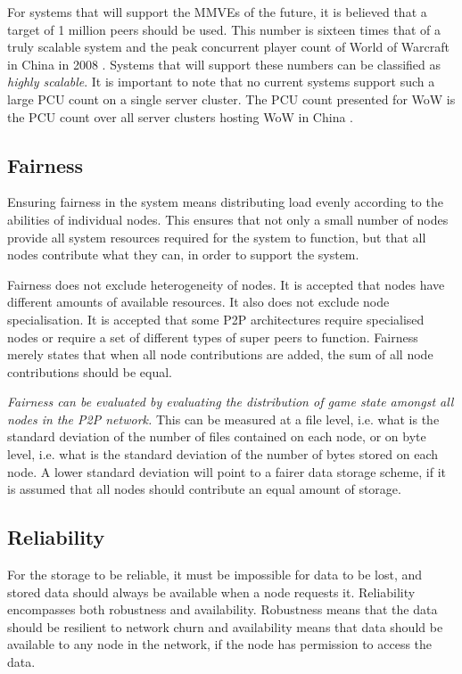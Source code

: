 For systems that will support the MMVEs of the future, it is believed that a target of 1 million peers should be used. This number is sixteen times that of a truly scalable system and the peak concurrent player count of World of Warcraft in China in 2008 \cite{WoW_china_pcu}. Systems that will support these numbers can be classified as \emph{highly scalable}. It is important to note that no current systems support such a large PCU count on a single server cluster. The PCU count presented for WoW is the PCU count over all server clusters hosting WoW in China \cite{WoW_china_pcu}.

\subsection{Fairness}
\label{fairness_requirement}

Ensuring fairness in the system means distributing load evenly according to the abilities of individual nodes. This ensures that not only a small number of nodes provide all system resources required for the system to function, but that all nodes contribute what they can, in order to support the system.

Fairness does not exclude heterogeneity of nodes. It is accepted that nodes have different amounts of available resources. It also does not exclude node specialisation. It is accepted that some P2P architectures require specialised nodes or require a set of different types of super peers to function. Fairness merely states that when all node contributions are added, the sum of all node contributions should be equal.

\emph{Fairness can be evaluated by evaluating the distribution of game state amongst all nodes in the P2P network.} This can be measured at a file level, i.e. what is the standard deviation of the number of files contained on each node, or on byte level, i.e. what is the standard deviation of the number of bytes stored on each node. A lower standard deviation will point to a fairer data storage scheme, if it is assumed that all nodes should contribute an equal amount of storage.

\subsection{Reliability}

For the storage to be reliable, it must be impossible for data to be lost, and stored data should always be available when a node requests it. Reliability encompasses both robustness and availability. Robustness means that the data should be resilient to network churn and availability means that data should be available to any node in the network, if the node has permission to access the data.

